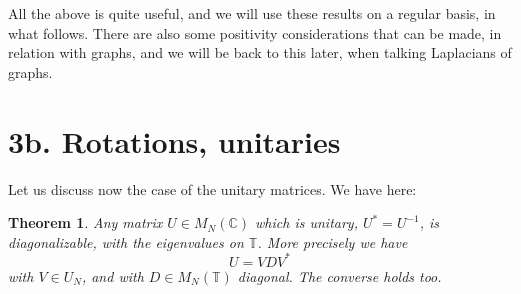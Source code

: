 \documentclass[12pt]{amsbook}
\newtheorem{theorem}{Theorem}[chapter]
\begin{document}
All the above is quite useful, and we will use these results on a regular basis, in what follows. There are also some positivity considerations that can be made, in relation with graphs, and we will be back to this later, when talking Laplacians of graphs.

\section*{3b. Rotations, unitaries}

Let us discuss now the case of the unitary matrices. We have here:


\begin{theorem}
Any matrix $U\in M_N(\mathbb C)$ which is unitary, $U^*=U^{-1}$, is diagonalizable, with the eigenvalues on $\mathbb T$. More precisely we have
$$U=VDV^*$$
with $V\in U_N$, and with $D\in M_N(\mathbb T)$ diagonal. The converse holds too.
\end{theorem}
\end{document}
